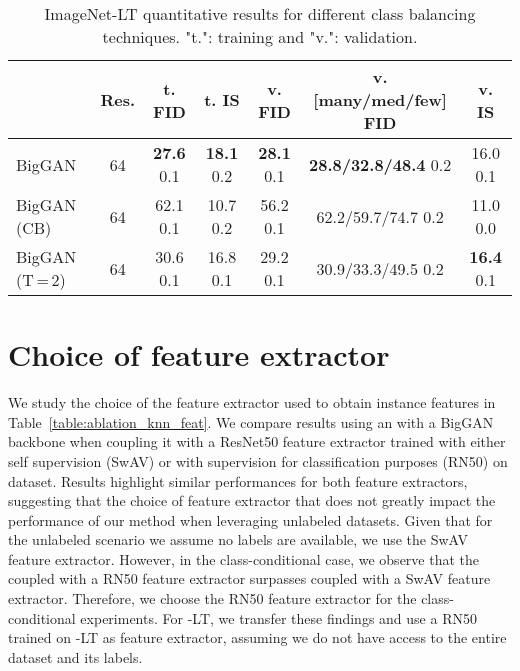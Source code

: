 \begin{table}[h]
\small
\centering
\caption{ImageNet-LT quantitative results for different class balancing techniques.
"t.": training and "v.": validation.}
 \begin{tabular}{@{}lc|cc|ccc@{}}
\toprule
 & \textbf{Res.} & \textbf{t. FID} & \textbf{t. IS} & \textbf{v. FID} & \textbf{v. [many/med/few] FID} & \textbf{v. IS} \\  \midrule
BigGAN & 64 & \textbf{27.6}  0.1 & \textbf{18.1}  0.2 & \textbf{28.1}  0.1  & \textbf{28.8/32.8/48.4}  0.2 & 16.0  0.1  \\
BigGAN (CB) & 64 & 62.1  0.1 & 10.7  0.2 & 56.2  0.1 & 62.2/59.7/74.7  0.2 & 11.0  0.0  \\
BigGAN (T\,=\,2) & 64 & 30.6  0.1 & 16.8  0.1 & 29.2  0.1  & 30.9/33.3/49.5  0.2 & \textbf{16.4}  0.1 \\
\bottomrule
\end{tabular}

 \label{table:imagenet_lt_balancing}
 \end{table}
 
 
 
\section{Choice of feature extractor}
\label{app:feature_extractor}

We study the choice of the feature extractor used to obtain instance features in Table~\ref{table:ablation_knn_feat}. We compare results using an \ours with a BigGAN backbone when coupling it with a ResNet50 feature extractor trained with either self supervision (SwAV) or with supervision for classification purposes (RN50) on \ImNet dataset. Results highlight similar \ours performances for both feature extractors, suggesting that the choice of feature extractor that does not greatly impact the performance of our method when leveraging unlabeled datasets. Given that for the unlabeled scenario we assume no labels are available, we use the SwAV feature extractor. However, in the class-conditional case, we observe that the \ours coupled with a RN50 feature extractor surpasses \ours coupled with a SwAV feature extractor. Therefore, we choose the RN50 feature extractor for the class-conditional experiments. For \ImNet-LT, we transfer these findings and use a RN50 trained on \ImNet-LT as feature extractor, assuming we do not have access to the entire \ImNet dataset and its labels.
 
